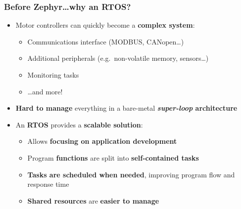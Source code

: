 \documentclass[handout]{beamer}
\begin{document}
\begin{frame}
  \frametitle{Before Zephyr\ldots why an RTOS?}

  \begin{itemize}
    \item<1-> Motor controllers can quickly become a \textbf{complex system}:
          \begin{itemize}
            \item Communications interface (MODBUS, CANopen\ldots)
            \item Additional peripherals (e.g.\ non-volatile memory,
                  sensors\ldots)
            \item Monitoring tasks
            \item \ldots and more!
          \end{itemize}
    \item<2-> \textbf{Hard to manage} everything in a bare-metal
          \textbf{\textit{super-loop} architecture}
    \item<3-> An \textbf{RTOS} provides a \textbf{scalable solution}:
          \begin{itemize}
            \item Allows \textbf{focusing on application development}
            \item Program \textbf{functions} are split into
                  \textbf{self-contained tasks}
            \item \textbf{Tasks are scheduled when needed}, improving program
                  flow and response time
            \item \textbf{Shared resources} are \textbf{easier to manage}
          \end{itemize}
  \end{itemize}
\end{frame}
\end{document}
